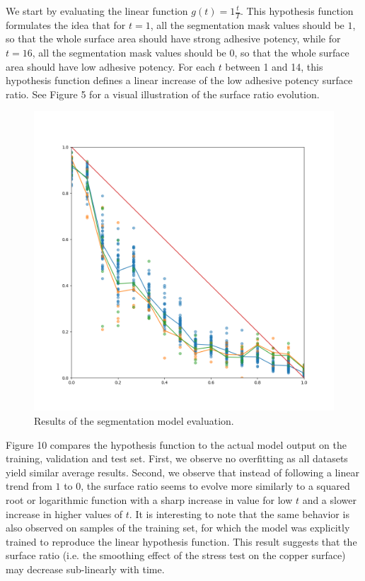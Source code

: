 \documentclass[10pt,twocolumn,letterpaper]{article}
\begin{document}
We start by evaluating the linear function $g(t)=1\frac{t}{T}$.
This hypothesis function formulates the idea that for $t=1$, 
all the  segmentation mask values should be $1$, 
so that the whole surface area should have strong adhesive potency, 
while for $t=16$, all the segmentation mask values should be $0$, so that 
the whole surface area should have low adhesive potency.
For each $t$ between 1 and 14, this hypothesis function defines a linear increase
of the low adhesive potency surface ratio.
See Figure 5 for a visual illustration of the surface ratio evolution.

\begin{figure}[h]
\centering
\includegraphics[width=0.9\linewidth]{"./figures/Figure10"}
\caption{
	Results of the segmentation model evaluation.
}
\end{figure}

Figure 10 compares the hypothesis function to the actual model output on the training, 
validation and test set.
First, we observe no overfitting as all datasets yield similar average results.
Second, we observe that instead of following a linear trend from $1$ to $0$, 
the surface ratio seems to evolve more similarly to a squared root or logarithmic function
with a sharp increase in value for low $t$ and a slower increase in higher values of $t$.
It is interesting to note that the same behavior is also observed on samples of the training set, 
for which the model was explicitly trained to reproduce the linear hypothesis function.
This result suggests that the surface ratio 
(i.e. the smoothing effect of the stress test on the copper surface) 
may decrease sub-linearly with time.
\end{document}
